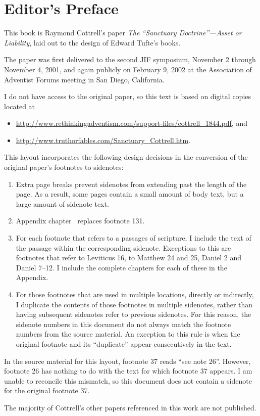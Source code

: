 \chapter{Editor's Preface}
\label{ch:editor}

\begin{fullwidth}
This book is Raymond Cottrell's paper \textit{The ``Sanctuary Doctrine''---Asset 
or Liability}, laid out to the design of Edward Tufte's books.  

The paper was first delivered to the second JIF symposium, November 2 through 
November 4, 2001, and again publicly on February 9, 2002 at the Association of 
Adventist Forums meeting in San Diego, California.

I do not have access to the original paper, so this text is based on digital copies
located at
\begin{itemize}
    \item \url{http://www.rethinkingadventism.com/support-files/cottrell_1844.pdf}, and
    \item \url{http://www.truthorfables.com/Sanctuary_Cottrell.htm}.
\end{itemize}

This layout incorporates the following design decisions in the conversion of
the original paper's footnotes to sidenotes:
\begin{enumerate}
    \item Extra page breaks prevent sidenotes from extending past the 
    length of the page. As a result, some pages contain a small amount of body
    text, but a large amount of sidenote text.
    \item Appendix chapter~ replaces footnote 131.
    \item For each footnote that refers to a passages of scripture, I include
    the text of the passage within the corresponding sidenote.  Exceptions
    to this are footnotes that refer to Leviticus 16, to Matthew 24 and 25,
    Daniel 2 and Daniel 7--12. I include the complete chapters for each
    of these in the Appendix.
    \item For those footnotes that are used in multiple locations, directly or 
    indirectly, I duplicate the contents of those footnotes in 
    multiple sidenotes, rather than having subsequent sidenotes refer to
    previous sidenotes. For this reason, the sidenote numbers in this document
    do not always match the footnote numbers from the source material.
    An exception to this rule is when the original
    footnote and its ``duplicate'' appear consecutively in the text.
\end{enumerate}

In the source material for this layout, footnote 37 reads ``see note 26''.
However, footnote 26 has nothing to do with the text for which footnote 37
appears.  I am unable to reconcile this
mismatch, so this document does not contain a sidenote for the original
footnote 37.



The majority of Cottrell's other papers referenced in this work are not
published.
\end{fullwidth}
